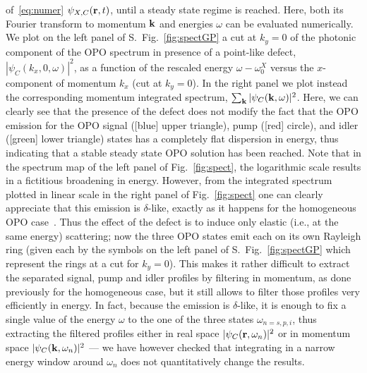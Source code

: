 of~\eqref{eq:numer} $\psi_{X,C} (\mathbf{r},t)$, until a steady state
regime is reached. Here, both its Fourier transform to momentum
$\mathbf{k}$ and energies $\omega$ can be evaluated numerically.
%
We plot on the left panel of S.~Fig.~\ref{fig:spectGP} a cut at $k_y=0$
of the photonic component of the OPO spectrum in presence of a
point-like defect, $|\psi_C(k_x,0,\omega)|^2$, as a function of the
rescaled energy $\omega - \omega_0^X$ versus the $x$-component of
momentum $k_x$ (cut at $k_y=0$). In the right panel we plot instead
the corresponding momentum integrated spectrum, $\sum_{\mathbf{k}}
|\psi_C(\mathbf{k},\omega)|^2$.
%
Here, we can clearly see that the presence of the defect does not
modify the fact that the OPO emission for the OPO signal ([blue] upper
triangle), pump ([red] circle), and idler ([green] lower triangle)
states has a completely flat dispersion in energy, thus indicating
that a stable steady state OPO solution has been reached. Note that in
the spectrum map of the left panel of Fig.~\ref{fig:spect}, the
logarithmic scale results in a fictitious broadening in
energy. However, from the integrated spectrum plotted in linear scale
in the right panel of Fig.~\ref{fig:spect} one can clearly appreciate
that this emission is $\delta$-like, exactly as it happens for the
homogeneous OPO case~\cite{9783642241857}.
%
Thus the effect of the defect is to induce only elastic (i.e., at the
same energy) scattering; now the three OPO states emit each on its own
Rayleigh ring (given each by the symbols on the left panel of
S.~Fig.~\ref{fig:spectGP} which represent the rings at a cut for
$k_y=0$). This makes it rather difficult to extract the separated
signal, pump and idler profiles by filtering in momentum, as done
previously for the homogeneous case, but it still allows to filter
those profiles very efficiently in energy. In fact, because the
emission is $\delta$-like, it is enough to fix a single value of the
energy $\omega$ to the one of the three states $\omega_{n=s,p,i}$,
thus extracting the filtered profiles either in real space
$|\psi_C(\mathbf{r},\omega_n)|^2$ or in momentum space
$|\psi_C(\mathbf{k},\omega_n)|^2$ --- we have however checked that
integrating in a narrow energy window around $\omega_n$ does not
quantitatively change the results.

